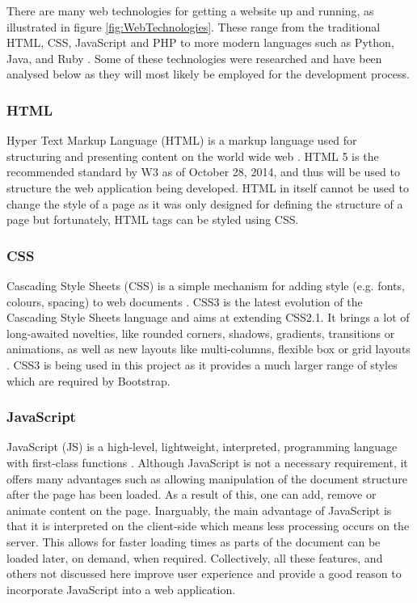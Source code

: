 There are many web technologies for getting a website up and running, as illustrated in figure \ref{fig:WebTechnologies}. These range from the traditional HTML, CSS, JavaScript and PHP to more modern languages such as Python, Java, and Ruby \cite{Differential:WebTechnologies}. Some of these technologies were researched and have been analysed below as they will most likely be employed for the development process.

\subsubsection{HTML} 
Hyper Text Markup Language (HTML) is a markup language used for structuring and presenting content on the world wide web \cite{W3:HTML5}. HTML 5 is the recommended standard by W3 as of October 28, 2014, and thus will be used to structure the web application being developed. HTML in itself cannot be used to change the style of a page as it was only designed for defining the structure of a page but fortunately, HTML tags can be styled using CSS.

\subsubsection{CSS} 
Cascading Style Sheets (CSS) is a simple mechanism for adding style (e.g. fonts, colours, spacing) to web documents \cite{W3:CSS}. CSS3 is the latest evolution of the Cascading Style Sheets language and aims at extending CSS2.1. It brings a lot of long-awaited novelties, like rounded corners, shadows, gradients, transitions or animations, as well as new layouts like multi-columns, flexible box or grid layouts \cite{Mozilla:CSS3}. CSS3 is being used in this project as it provides a much larger range of styles which are required by Bootstrap.

\subsubsection{JavaScript}
JavaScript (JS) is a high-level, lightweight, interpreted, programming language with first-class functions \cite{Mozilla:JavaScript}. Although JavaScript is not a necessary requirement, it offers many advantages such as allowing manipulation of the document structure after the page has been loaded. As a result of this, one can add, remove or animate content on the page. Inarguably, the main advantage of JavaScript is that it is interpreted on the client-side which means less processing occurs on the server. This allows for faster loading times as parts of the document can be loaded later, on demand, when required. Collectively, all these features, and others not discussed here improve user experience and provide a good reason to incorporate JavaScript into a web application.

